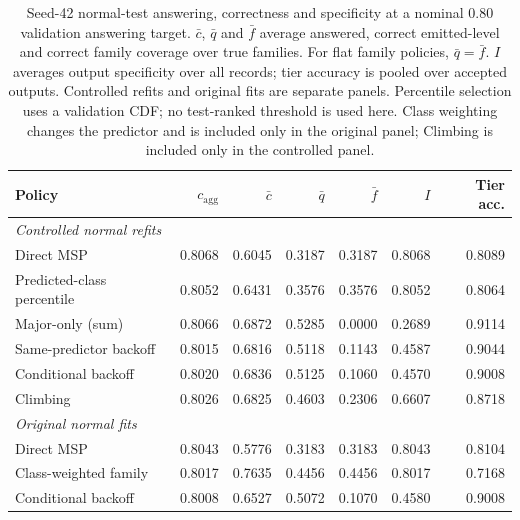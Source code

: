 \begin{table}[pos=htbp]
\centering\footnotesize
\setlength{\tabcolsep}{3.2pt}
\caption{Seed-42 normal-test answering, correctness and specificity at a nominal 0.80 validation answering target. $\bar c$, $\bar q$ and $\bar f$ average answered, correct emitted-level and correct family coverage over true families. For flat family policies, $\bar q=\bar f$. $I$ averages output specificity over all records; tier accuracy is pooled over accepted outputs. Controlled refits and original fits are separate panels. Percentile selection uses a validation CDF; no test-ranked threshold is used here. Class weighting changes the predictor and is included only in the original panel; Climbing is included only in the controlled panel.}
\label{tab:policy_master}
\begin{tabular}{lrrrrrr}
\toprule
Policy & $c_{\mathrm{agg}}$ & $\bar c$ & $\bar q$ & $\bar f$ & $I$ & Tier acc. \\
\midrule
\multicolumn{7}{l}{\textit{Controlled normal refits}} \\
Direct MSP & 0.8068 & 0.6045 & 0.3187 & 0.3187 & 0.8068 & 0.8089 \\
Predicted-class percentile & 0.8052 & 0.6431 & 0.3576 & 0.3576 & 0.8052 & 0.8064 \\
Major-only (sum) & 0.8066 & 0.6872 & 0.5285 & 0.0000 & 0.2689 & 0.9114 \\
Same-predictor backoff & 0.8015 & 0.6816 & 0.5118 & 0.1143 & 0.4587 & 0.9044 \\
Conditional backoff & 0.8020 & 0.6836 & 0.5125 & 0.1060 & 0.4570 & 0.9008 \\
Climbing & 0.8026 & 0.6825 & 0.4603 & 0.2306 & 0.6607 & 0.8718 \\
\midrule
\multicolumn{7}{l}{\textit{Original normal fits}} \\
Direct MSP & 0.8043 & 0.5776 & 0.3183 & 0.3183 & 0.8043 & 0.8104 \\
Class-weighted family & 0.8017 & 0.7635 & 0.4456 & 0.4456 & 0.8017 & 0.7168 \\
Conditional backoff & 0.8008 & 0.6527 & 0.5072 & 0.1070 & 0.4580 & 0.9008 \\
\bottomrule
\end{tabular}
\end{table}
